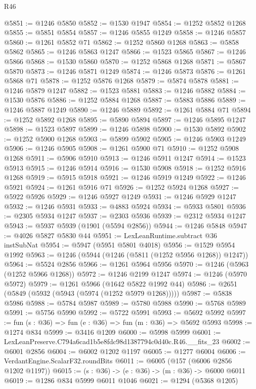 \begin{lexlean}{R46}
\begin{coremodule}
@5851 := @1246 @5850
@5852 := @1530 @1947
@5854 := @1252 @5852 @1268
@5855 := @5851 @5854
@5857 := @1246 @5855 @1249
@5858 := @1246 @5857
@5860 := @1261 @5852 @71
@5862 := @1252 @5860 @1268
@5863 := @5858 @5862
@5865 := @1246 @5863 @1247
@5866 := @1523 @5865
@5867 := @1246 @5866
@5868 := @1530 @5860
@5870 := @1252 @5868 @1268
@5871 := @5867 @5870
@5873 := @1246 @5871 @1249
@5874 := @1246 @5873
@5876 := @1261 @5868 @71
@5878 := @1252 @5876 @1268
@5879 := @5874 @5878
@5881 := @1246 @5879 @1247
@5882 := @1523 @5881
@5883 := @1246 @5882
@5884 := @1530 @5876
@5886 := @1252 @5884 @1268
@5887 := @5883 @5886
@5889 := @1246 @5887 @1249
@5890 := @1246 @5889
@5892 := @1261 @5884 @71
@5894 := @1252 @5892 @1268
@5895 := @5890 @5894
@5897 := @1246 @5895 @1247
@5898 := @1523 @5897
@5899 := @1246 @5898
@5900 := @1530 @5892
@5902 := @1252 @5900 @1268
@5903 := @5899 @5902
@5905 := @1246 @5903 @1249
@5906 := @1246 @5905
@5908 := @1261 @5900 @71
@5910 := @1252 @5908 @1268
@5911 := @5906 @5910
@5913 := @1246 @5911 @1247
@5914 := @1523 @5913
@5915 := @1246 @5914
@5916 := @1530 @5908
@5918 := @1252 @5916 @1268
@5919 := @5915 @5918
@5921 := @1246 @5919 @1249
@5922 := @1246 @5921
@5924 := @1261 @5916 @71
@5926 := @1252 @5924 @1268
@5927 := @5922 @5926
@5929 := @1246 @5927 @1249
@5931 := @1246 @5929 @1247
@5932 := @1246 @5931
@5933 := @4883 @5924
@5934 := @5933 @5801
@5936 := @2305 @5934 @1247
@5937 := @2303 @5936
@5939 := @2312 @5934 @1247
@5943 := @5937 @5939 (@1901 (@5594 @2856))
@5944 := @1246 @5848
@5947 := @4026 @5827 @5830 @44
@5951 := LexLeanRuntime.subtract @36 instSubNat
@5954 := @5947 (@5951 @5801 @4018)
@5956 := @1529 @5954 @1992
@5963 := @1246 (@5944 (@1246 (@5811 (@1252 @5956 @1268)) @1247))
@5964 := @5524 @2856
@5966 := @1261 @5964 @5956
@5970 := @1246 (@5963 (@1252 @5966 @1268))
@5972 := @1246 @2199 @1247
@5974 := @1246 (@5970 @5972)
@5979 := @1261 @5966 (@1642 @5822 @1992 @44)
@5986 := @2651 (@5849 (@5932 (@5943 (@5974 (@1252 @5979 @1268)))))
@5987 := @5838 @5986
@5988 := @5784 @5987
@5989 := @5780 @5988
@5990 := @5768 @5989
@5991 := @5756 @5990
@5992 := @5722 @5991
@5993 := @5692 @5992
@5997 := fun (s : @36) => fun (e : @36) => fun (m : @36) => @5692 @5993
@5998 := @1274 @834
@5999 := @3416 @1209
@6000 := @5998 @5999
@6001 := LexLeanPreserve.C794a6cad1b5e8fdc98d1387794c0d40c.R46.__fits_23
@6002 := @6001 @2856
@6004 := @6002 @1202 @1197
@6005 := @1277 @6004
@6006 := VerdantEngine.ScalarF32.roundBits
@6011 := @6005 (@157 (@6006 @2856 @1202 @1197))
@6015 := (s : @36) -> (e : @36) -> (m : @36) -> @6000 @6011
@6019 := @1286 @834 @5999 @6011 @1046
@6021 := @1294 (@5368 @1205)

\end{coremodule}
\end{lexlean}
